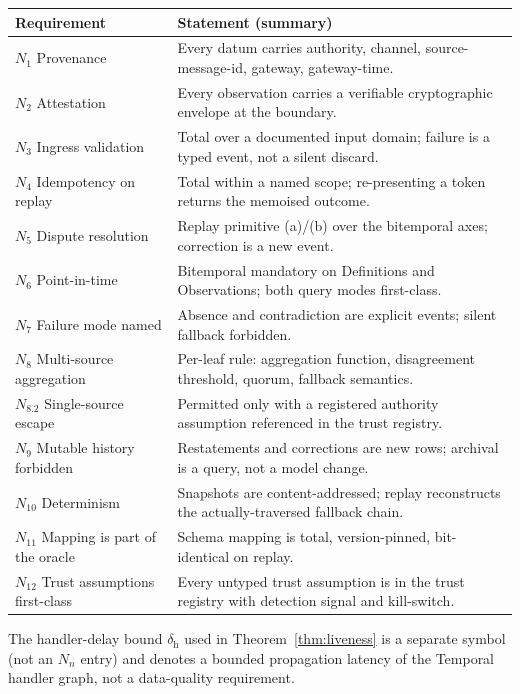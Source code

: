 \documentclass[11pt,a4paper]{article}
\begin{document}
\begin{center}
\begin{tabular}{@{}ll@{}}
\toprule
\textbf{Requirement} & \textbf{Statement (summary)} \\
\midrule
$N_1$ Provenance & Every datum carries authority, channel, source-message-id, gateway, gateway-time. \\
$N_2$ Attestation & Every observation carries a verifiable cryptographic envelope at the boundary. \\
$N_3$ Ingress validation & Total over a documented input domain; failure is a typed event, not a silent discard. \\
$N_4$ Idempotency on replay & Total within a named scope; re-presenting a token returns the memoised outcome. \\
$N_5$ Dispute resolution & Replay primitive (a)/(b) over the bitemporal axes; correction is a new event. \\
$N_6$ Point-in-time & Bitemporal mandatory on Definitions and Observations; both query modes first-class. \\
$N_7$ Failure mode named & Absence and contradiction are explicit events; silent fallback forbidden. \\
$N_8$ Multi-source aggregation & Per-leaf rule: aggregation function, disagreement threshold, quorum, fallback semantics. \\
$N_8.2$ Single-source escape & Permitted only with a registered authority assumption referenced in the trust registry. \\
$N_9$ Mutable history forbidden & Restatements and corrections are new rows; archival is a query, not a model change. \\
$N_{10}$ Determinism & Snapshots are content-addressed; replay reconstructs the actually-traversed fallback chain. \\
$N_{11}$ Mapping is part of the oracle & Schema mapping is total, version-pinned, bit-identical on replay. \\
$N_{12}$ Trust assumptions first-class & Every untyped trust assumption is in the trust registry with detection signal and kill-switch. \\
\bottomrule
\end{tabular}
\end{center}

The handler-delay bound $\delta_{\mathrm{h}}$ used in Theorem~\ref{thm:liveness} is a separate symbol (not an $N_n$ entry) and denotes a bounded propagation latency of the Temporal handler graph, not a data-quality requirement.
\end{document}
